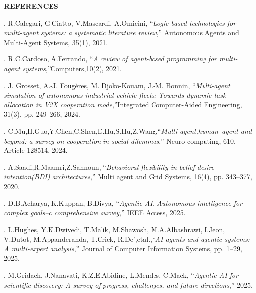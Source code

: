 \documentclass[12pt,letterpaper]{article}
\begin{document}
\thispagestyle{empty}
\begin{center}
  {\fontsize{14pt}{17pt}\selectfont\bfseries REFERENCES\par}
\end{center}
\vspace{10pt}

\begingroup
\sloppy
\fontsize{12pt}{25.8pt}\selectfont
{}. R.Calegari, G.Ciatto, V.Mascardi, A.Omicini, ``\textit{Logic-based technologies for multi-agent systems: a systematic literature review},'' Autonomous Agents and Multi-Agent Systems, 35(1), 2021.

\vspace{6pt}
. R.C.Cardoso, A.Ferrando, ``\textit{A review of agent-based programming for multi-agent systems},''Computers,10(2), 2021.

\vspace{6pt}
. J. Grosset, A.-J. Fougères, M. Djoko-Kouam, J.-M. Bonnin, ``\textit{Multi-agent simulation of autonomous industrial vehicle fleets: Towards dynamic task allocation in V2X cooperation mode},''Integrated Computer-Aided Engineering, 31(3), pp. 249–266, 2024.

\vspace{6pt}
. C.Mu,H.Guo,Y.Chen,C.Shen,D.Hu,S.Hu,Z.Wang,``\textit{Multi-agent,human–agent and beyond: a survey on cooperation in social dilemmas},'' Neuro computing, 610, Article 128514, 2024.

\vspace{6pt}
. A.Saadi,R.Maamri,Z.Sahnoun, ``\textit{Behavioral flexibility in belief-desire-intention(BDI) architectures},'' Multi agent and Grid Systems, 16(4), pp. 343–377, 2020.

\vspace{6pt}
. D.B.Acharya, K.Kuppan, B.Divya, ``\textit{Agentic AI: Autonomous intelligence for complex goals–a comprehensive survey},'' IEEE Access, 2025.

\vspace{6pt}
. L.Hughes, Y.K.Dwivedi, T.Malik, M.Shawosh, M.A.Albashrawi, I.Jeon, V.Dutot, M.Appanderanda, T.Crick, R.De',etal.,``\textit{AI agents and agentic systems: A multi-expert analysis},'' Journal of Computer Information Systems, pp. 1–29, 2025.

\vspace{6pt}
. M.Gridach, J.Nanavati, K.Z.E.Abidine, L.Mendes, C.Mack, ``\textit{Agentic AI for scientific discovery: A survey of progress, challenges, and future directions},'' 2025.
\endgroup
\newpage
\end{document}

